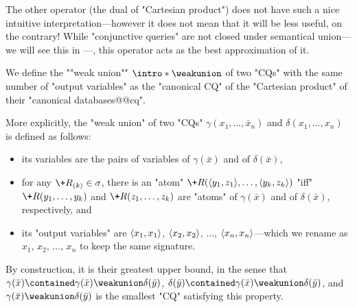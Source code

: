 The other operator (the dual of "Cartesian product")
does not have such a nice intuitive interpretation---however
it does not mean that it will be less useful, on the contrary!
While "conjunctive queries" are not closed under
semantical union---we will see this in ---, this operator
acts as the best approximation of it.

\begin{definition}
	We define the \AP""weak union"" \AP$\intro*\weakunion$ of two "CQs"
	with the same number of "output variables"
	as the "canonical CQ" of the "Cartesian product" of their "canonical databases@@cq".
\end{definition}

More explicitly, the "weak union" of two "CQs" $\gamma(x_1, \hdots, \bar x_n)$
and $\delta(x_1, \hdots, x_n)$ is defined as follows:
\begin{itemize}
	\item its variables are the pairs of variables of $\gamma(\bar x)$ and of $\delta(\bar x)$,
	\item for any $\+R_{(k)} \in \sigma$, there is an "atom" $\+R(\tup{y_1, z_1}, \dotsc, \tup{y_k, z_k})$ "iff" $\+R(y_1, \dotsc, y_k)$ and $\+R(z_1, \dotsc, z_k)$ are "atoms" of
	$\gamma(\bar x)$ and of $\delta(\bar x)$, respectively, and
	\item its "output variables" are $\langle x_1, x_1\rangle$, $\langle x_2, x_2\rangle$,
	$\dotsc$, $\langle x_n, x_n\rangle$---which we rename as $x_1$, $x_2$, $\dotsc$, $x_n$ to keep
	the same signature.
\end{itemize}

By construction, it is their greatest upper bound,
in the sense that
$\gamma(\bar x) \contained \gamma(\bar x) \weakunion \delta(\bar y)$,
$\delta(\bar y) \contained \gamma(\bar x) \weakunion \delta(\bar y)$,
and $\gamma(\bar x) \weakunion \delta(\bar y)$ is the smallest "CQ" satisfying this property.

